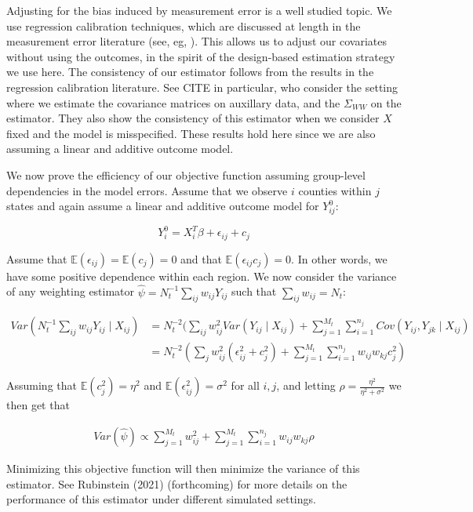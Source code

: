 \documentclass[12pt]{article}
\begin{document}
Adjusting for the bias induced by measurement error is a well studied topic. We use regression calibration techniques, which are discussed at length in the measurement error literature (see, eg, \cite{carroll2006measurement}). This allows us to adjust our covariates without using the outcomes, in the spirit of the design-based estimation strategy we use here. The consistency of our estimator follows from the results in the regression calibration literature. See CITE in particular, who consider the setting where we estimate the covariance matrices on auxillary data, and the $\Sigma_{WW}$ on the estimator. They also show the consistency of this estimator when we consider $X$ fixed and the model is misspecified. These results hold here since we are also assuming a linear and additive outcome model.

We now prove the efficiency of our objective function assuming group-level dependencies in the model errors. Assume that we observe $i$ counties within $j$ states and again assume a linear and additive outcome model for $Y_{ij}^0$:

$$
Y_i^0 = X_i^T\beta + \epsilon_{ij} + c_j
$$

Assume that $\mathbb{E}(\epsilon_{ij}) = \mathbb{E}(c_j) = 0$ and that $\mathbb{E}(\epsilon_{ij}c_j) = 0$. In other words, we have some positive dependence within each region. We now consider the variance of any weighting estimator $\hat{\psi} = N_t^{-1}\sum_{ij}w_{ij}Y_{ij}$ such that $\sum_{ij} w_{ij} = N_t$:

\begin{align*}
    Var(N_t^{-1}\sum_{ij}w_{ij}Y_{ij} \mid X_{ij}) &= N_t^{-2}(\sum_{ij}w_{ij}^2Var(Y_{ij} \mid X_{ij}) + \sum_{j=1}^{M_t}\sum_{i=1}^{n_j}Cov(Y_{ij}, Y_{jk} \mid X_{ij}) \\
    &= N_t^{-2} (\sum_j w_{ij}^2(\epsilon_{ij}^2 + c_j^2) + \sum_{j=1}^{M_t}\sum_{i=1}^{n_j}w_{ij}w_{kj}c_j^2)
\end{align*}

Assuming that $\mathbb{E}(c_j^2) = \eta^2$ and $\mathbb{E}(\epsilon_{ij}^2) = \sigma^2$ for all $i, j$, and letting $\rho = \frac{\eta^2}{\eta^2 + \sigma^2}$ we then get that

\begin{align*}
    Var(\hat{\psi}) \propto \sum_{j=1}^{M_t} w_{ij}^2 + \sum_{j=1}^{M_t}\sum_{i=1}^{n_j}w_{ij}w_{kj}\rho
\end{align*}

Minimizing this objective function will then minimize the variance of this estimator. See Rubinstein (2021) (forthcoming) for more details on the performance of this estimator under different simulated settings.
\end{document}
